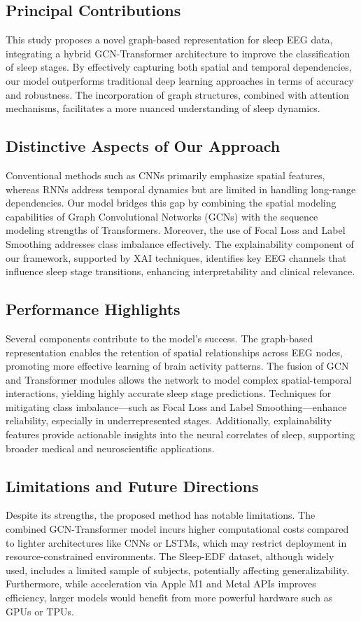 


\subsection{Principal Contributions}
This study proposes a novel graph-based representation for sleep EEG data, integrating a hybrid GCN-Transformer architecture to improve the classification of sleep stages. By effectively capturing both spatial and temporal dependencies, our model outperforms traditional deep learning approaches in terms of accuracy and robustness. The incorporation of graph structures, combined with attention mechanisms, facilitates a more nuanced understanding of sleep dynamics.

\subsection{Distinctive Aspects of Our Approach}
Conventional methods such as CNNs primarily emphasize spatial features, whereas RNNs address temporal dynamics but are limited in handling long-range dependencies. Our model bridges this gap by combining the spatial modeling capabilities of Graph Convolutional Networks (GCNs) with the sequence modeling strengths of Transformers. Moreover, the use of Focal Loss and Label Smoothing addresses class imbalance effectively. The explainability component of our framework, supported by XAI techniques, identifies key EEG channels that influence sleep stage transitions, enhancing interpretability and clinical relevance.

\subsection{Performance Highlights}
Several components contribute to the model’s success. The graph-based representation enables the retention of spatial relationships across EEG nodes, promoting more effective learning of brain activity patterns. The fusion of GCN and Transformer modules allows the network to model complex spatial-temporal interactions, yielding highly accurate sleep stage predictions. Techniques for mitigating class imbalance—such as Focal Loss and Label Smoothing—enhance reliability, especially in underrepresented stages. Additionally, explainability features provide actionable insights into the neural correlates of sleep, supporting broader medical and neuroscientific applications.

\subsection{Limitations and Future Directions}
Despite its strengths, the proposed method has notable limitations. The combined GCN-Transformer model incurs higher computational costs compared to lighter architectures like CNNs or LSTMs, which may restrict deployment in resource-constrained environments. The Sleep-EDF dataset, although widely used, includes a limited sample of subjects, potentially affecting generalizability. Furthermore, while acceleration via Apple M1 and Metal APIs improves efficiency, larger models would benefit from more powerful hardware such as GPUs or TPUs. 

